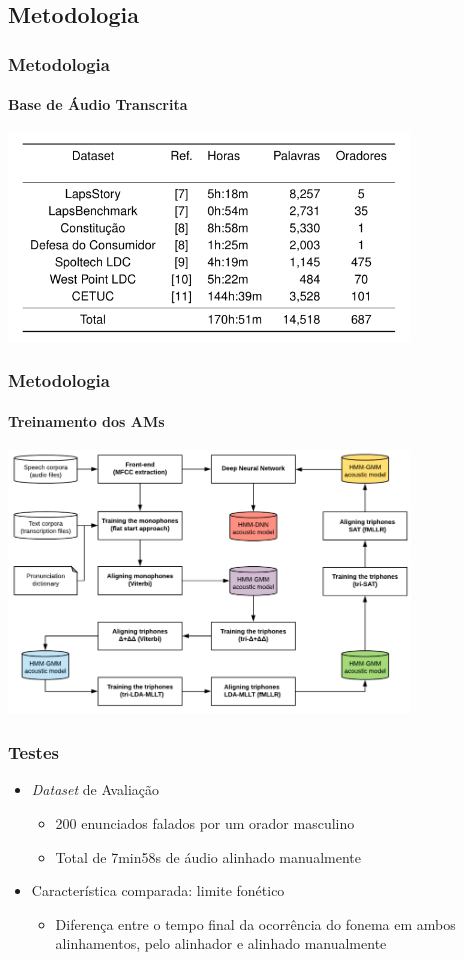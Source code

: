 \subsection{Metodologia}
\begin{frame}
    \frametitle{Metodologia}
    \framesubtitle{Base de \'Audio Transcrita}
    \begin{center}
        \includegraphics[width=0.8\textwidth]{Figures/db}
    \end{center}
\end{frame}

\begin{frame}
    \frametitle{Metodologia}
    \framesubtitle{Treinamento dos AMs}
    \begin{center}
        \includegraphics[width=0.8\textwidth]{Figures/training}
    \end{center}
\end{frame}

\begin{frame}
    \frametitle{Testes}
    \begin{itemize}
        \item \textit{Dataset} de Avalia\c c\~ao
        \begin{itemize}
            \item 200 enunciados falados por um orador masculino
            \item Total de 7min58s de \'audio alinhado manualmente
        \end{itemize}
        \item Caracter\'istica comparada: limite fon\'etico
        \begin{itemize}
            \item Diferen\c ca entre o tempo final da ocorr\^encia do fonema em ambos alinhamentos, pelo alinhador e alinhado manualmente
        \end{itemize}
    \end{itemize}
\end{frame}
